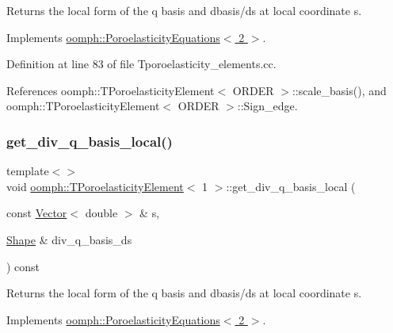 Returns the local form of the q basis and dbasis/ds at local coordinate s. 



Implements \hyperlink{classoomph_1_1PoroelasticityEquations_ae137222ce1c7904212ce34ad180123f8}{oomph\+::\+Poroelasticity\+Equations$<$ 2 $>$}.



Definition at line 83 of file Tporoelasticity\+\_\+elements.\+cc.



References oomph\+::\+T\+Poroelasticity\+Element$<$ O\+R\+D\+E\+R $>$\+::scale\+\_\+basis(), and oomph\+::\+T\+Poroelasticity\+Element$<$ O\+R\+D\+E\+R $>$\+::\+Sign\+\_\+edge.

\mbox{\label{classoomph_1_1TPoroelasticityElement_a6999bf7f38c269d952fe56cff1f701ca}} 
\subsubsection{\texorpdfstring{get\+\_\+div\+\_\+q\+\_\+basis\+\_\+local()}{get\_div\_q\_basis\_local()}\hspace{0.1cm}{\footnotesize\ttfamily [2/3]}}
{\footnotesize\ttfamily template$<$$>$ \\
void \hyperlink{classoomph_1_1TPoroelasticityElement}{oomph\+::\+T\+Poroelasticity\+Element}$<$ 1 $>$\+::get\+\_\+div\+\_\+q\+\_\+basis\+\_\+local (\begin{DoxyParamCaption}\item[{const \hyperlink{classoomph_1_1Vector}{Vector}$<$ double $>$ \&}]{s,  }\item[{\hyperlink{classoomph_1_1Shape}{Shape} \&}]{div\+\_\+q\+\_\+basis\+\_\+ds }\end{DoxyParamCaption}) const\hspace{0.3cm}{\ttfamily [virtual]}}



Returns the local form of the q basis and dbasis/ds at local coordinate s. 



Implements \hyperlink{classoomph_1_1PoroelasticityEquations_ae137222ce1c7904212ce34ad180123f8}{oomph\+::\+Poroelasticity\+Equations$<$ 2 $>$}.



